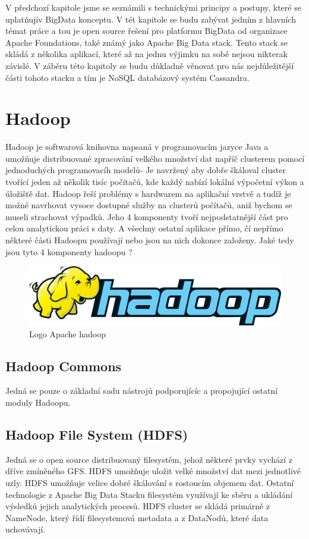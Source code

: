 V předchozí kapitole jsme se seznámili s technickými principy a postupy, které se uplatňujív BigData konceptu. V tét kapitole se budu zabývat jedním z hlavních témat práce a tou je open source řešení pro platformu BigData od organizace Apache Foundations, také známý jako Apache Big Data stack. Tento stack se skládá z několika aplikací, které až na jednu výjimku na sobě nejsou nikterak závislé. V záběru této kapitoly se budu důkladně věnovat pro nás nejdůležitější části tohoto stacku a tím je NoSQL databázový systém Cassandra.

\section{Hadoop}




Hadoop je softwarová knihovna napsaná v programovacím jazyce Java a umožňuje distribuované zpracování velkého množství dat napříč clusterem pomocí jednoduchých programovacíh modelů- Je navržený aby dobře škáloval cluster tvořící jeden až několik tisíc počítačů, kde každý nabízí lokální výpočetní výkon a úložiště dat. Hadoop řeší problémy s hardwarem na aplikační vrstvě a tudíž je možné navrhovat vysoce dostupné služby na clusterů počítačů, aniž bychom se museli strachovat výpadků. Jeho 4 komponenty tvoří nejpodstatnější část pro celou analytickou práci s  daty. A všechny ostatní aplikace přímo, čí nepřímo některé části Hadoopu používají nebo jsou na nich dokonce založeny. Jaké tedy jsou tyto 4 komponenty hadoopu ?


\begin{figure}[h]
\centering
\includegraphics[scale=0.15]{images/hadoop}
\caption{Logo Apache hadoop}
\label{fig:yarn}

\end{figure}


\subsection{Hadoop Commons}
Jedná se pouze o základní sadu nástrojů podporujícíc a propojující ostatní moduly Hadoopu.


\subsection{Hadoop File System (HDFS)}
Jedná se o open source distribuovaný filesystém, jehož některé prvky vychází z dříve zmíněného GFS. HDFS umožňuje uložit velké množství dat mezi jednotlivé uzly.  HDFS umožňuje velice dobré škálování s rostoucím objemem dat. Ostatní technologie z Apache Big Data Stacku filesystém využívají ke sběru a ukládání výsledků jejich analytických procesů. HDFS cluster se skládá primárně z NameNode, který řídí filesystemová metadata a z DataNodů, které data uchovávají. 

